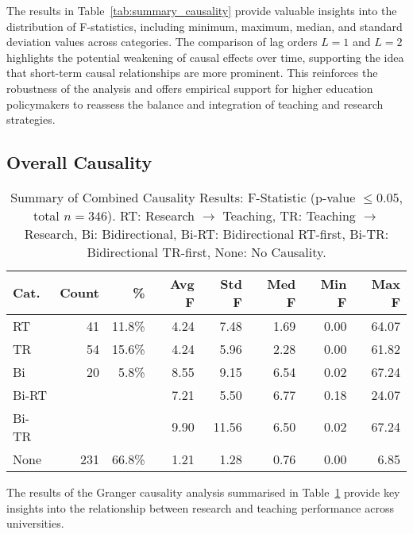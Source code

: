 \documentclass[conference]{IEEEtran}
\begin{document}
The results in Table~\ref{tab:summary_causality} provide valuable insights into the distribution of F-statistics, including minimum, maximum, median, and standard deviation values across categories. The comparison of lag orders $L=1$ and $L=2$ highlights the potential weakening of causal effects over time, supporting the idea that short-term causal relationships are more prominent. This reinforces the robustness of the analysis and offers empirical support for higher education policymakers to reassess the balance and integration of teaching and research strategies.


\subsection{Overall Causality}
\begin{table}
	\centering
	\caption{Summary of Combined Causality Results: F-Statistic (p-value $\leq 0.05$, total $n=346$). RT: Research $\rightarrow$ Teaching, TR: Teaching $\rightarrow$ Research, Bi: Bidirectional, Bi-RT: Bidirectional RT-first, Bi-TR: Bidirectional TR-first, None: No Causality.}
	\label{tab:granger_overall}
	\begin{scriptsize}
	\begin{tabular}{|l|r|r|r|r|r|r|r|}
		\hline
		\textbf{Cat.} & \textbf{Count} & \textbf{\%} 
		& \textbf{Avg F} & \textbf{Std F} & \textbf{Med F} & \textbf{Min F} & \textbf{Max F} \\ \hline
		RT               & 41  & 11.8\% & 4.24  & 7.48  & 1.69  & 0.00  & 64.07 \\ \hline
		TR               & 54  & 15.6\% & 4.24  & 5.96  & 2.28  & 0.00  & 61.82 \\ \hline
		Bi               & 20  & 5.8\%  & 8.55  & 9.15  & 6.54  & 0.02  & 67.24 \\ \hline
		\hfill Bi-RT     &   &   & 7.21  & 5.50  & 6.77  & 0.18  & 24.07 \\ \hline
		\hfill Bi-TR     &   &   & 9.90  & 11.56 & 6.50  & 0.02  & 67.24 \\ \hline
		None             & 231 & 66.8\% & 1.21  & 1.28  & 0.76  & 0.00  & 6.85  \\ \hline
	\end{tabular}
\end{scriptsize}
\end{table}

The results of the Granger causality analysis summarised in Table~\ref{tab:granger_overall} provide key insights into the relationship between research and teaching performance across universities.
\end{document}
